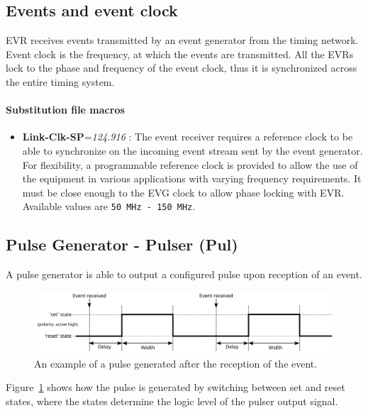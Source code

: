 \documentclass[12pt,a4paper]{article}
\begin{document}
\subsection{Events and event clock}\label{sec:Events and event clock}
EVR receives events transmitted by an event generator from the timing network. Event clock is the frequency, at which the events are transmitted. All the EVRs lock to the phase and frequency of the event clock, thus it is synchronized across the entire timing system.

\paragraph{Substitution file macros}
\begin{itemize}
\item
	\textbf{Link-Clk-SP}=\emph{124.916} : The event receiver requires a
reference clock to be able to synchronize on the incoming event
stream sent by the event generator. For flexibility, a programmable
reference clock is provided to allow the use of the equipment in
various applications with varying frequency requirements. It must be
close enough to the EVG clock to allow phase locking with
EVR. Available values are \texttt{50~MHz - 150~MHz}. 
\end{itemize}

\subsection{Pulse Generator - Pulser (Pul)}\label{sec:Pulser}
A pulse generator is able to output a configured pulse upon reception of an event.
\begin{figure}[H]
	\centering
	\includegraphics[width=\columnwidth]{./img/pulserGeneric}
	\caption{An example of a pulse generated after the reception of the event.}
	\label{fig:pulser_generic}
\end{figure}
Figure~\ref{fig:pulser_generic} shows how the pulse is generated by switching between set and reset states, where the states determine the logic level of the pulser output signal.
\end{document}
